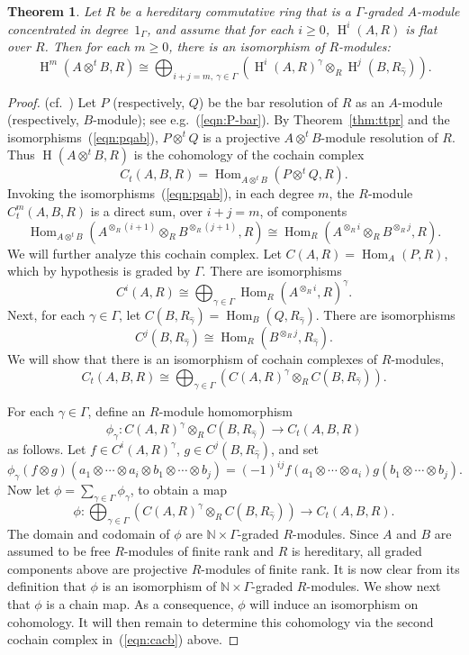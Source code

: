 \documentclass[11pt]{amsart}
\numberwithin{equation}{section}
\newtheorem{theorem}[equation]{Theorem}
\theoremstyle{definition}
\theoremstyle{remark}
\newcommand{\g}{\gamma}
\newcommand{\hg}{\widehat{\g}}
\newcommand{\N}{\mathbb{N}}
\newcommand\Homol{\operatorname{H}}
\newcommand\coh{\Homol}
\newcommand\ot{\otimes}
\newcommand\ott{\otimes^{t}\!}
\newcommand\Hom{\operatorname{Hom}}
\begin{document}
\begin{theorem}\label{thm:main}
  Let $R$ be a hereditary commutative ring that is a 
$\Gamma$-graded $A$-module concentrated in degree~$1_{\Gamma}$,
  and assume that for each $i\geq 0$, 
  $\coh^i(A,R)$ is flat over $R$.
  Then for each $m\geq 0$, 
  there is an isomorphism of $R$-modules:
  \[
  \coh^m(A\ott B , R)\cong \bigoplus_{i+j=m, \ \g\in\Gamma}
   \left( \coh^i(A, R)^{\g} \ot_R \coh^j(B, R_{\hg}) \right) .
  \]
\end{theorem}


\begin{proof}
(cf.~\cite[Theorem 3.1]{BW})
Let $P$ (respectively, $Q$) be the bar resolution of $R$
as an $A$-module (respectively, $B$-module); see e.g.~(\ref{eqn:P-bar}).
By Theorem~\ref{thm:ttpr} and the isomorphisms~(\ref{eqn:pqab}), $P\ott Q$ is a
projective $A\ott B$-module resolution of $R$.
Thus $\coh(A\ott B, R)$ is the
  cohomology of the cochain complex 
\[
   C_t(A,B,R) = \Hom_{A\ott B}(P\ott Q , R) .
\]
  Invoking the isomorphisms~(\ref{eqn:pqab}),  
  in each degree $m$, the $R$-module $C^m_t(A,B,R)$ is a direct sum, over
  $i+j=m$, of components
  \begin{equation}\label{eqn:homab}
  \Hom_{A\ott B}(A^{\ot_R  (i+1)}\ot_R  B^{\ot_R (j+1)}, R)
  \cong  \Hom_{R}(A^{\ot_R  i}\ot_R  B^{\ot_R j}, R) .
  \end{equation}
  We will further analyze this cochain complex.
    Let $C(A,R) = \Hom_A (P,R)$, which by hypothesis is graded by $\Gamma$.
    There are isomorphisms
    \[
    C^i(A,R) \cong  \bigoplus_{\g\in\Gamma}\Hom_R(A^{\ot_R i} , R)^{\g} . 
    \]
Next, for each $\g\in \Gamma$, let $C(B,R_{\hg}) = \Hom_B(Q, R_{\hg})$.
There are isomorphisms
  \[
   C^j(B,R_{\hg})  \cong  \Hom_R (B^{\ot_R j},R_{\hg}) .
   \]
   We will show that there is an isomorphism of cochain complexes of $R$-modules, 
   \begin{equation}\label{eqn:cacb}
   C_t(A,B,R) \cong  
  \bigoplus_{\g\in\Gamma} \left(C(A,R)^{\g} \ot_R C(B, R_{\hg})\right) .
  \end{equation}

For each $\g\in\Gamma$, define an $R$-module homomorphism
  \[
    \phi_{\g}:    C(A,R)^{\g} \ot_R C(B, R_{\hg}) \rightarrow C_t(A,B,R)
    \]
as follows. 
Let $f\in C^i(A,R)^{\g}$, $g\in C^j(B,R_{\hg})$, and set
    \[
    \phi_{\g}(f\ot g) (a_1\ot\cdots\ot a_i \ot  b_1\ot \cdots\ot b_j)
    = (-1)^{ij}  f(a_1\ot\cdots \ot a_i)g(b_1\ot\cdots\ot b_j) .
    \]
Now let $\phi = \sum_{\g\in\Gamma}\phi_{\g}$, to obtain a map
\[
  \phi:  \bigoplus_{\g\in\Gamma} \left(C(A,R)^{\g} \ot_R C(B, R_{\hg})\right)
  \rightarrow C_t(A,B,R) .
  \]
The domain and codomain of $\phi$ are $\N\times \Gamma$-graded $R$-modules. 
Since $A$ and $B$ are assumed to be 
free $R$-modules of finite rank and $R$ is hereditary, 
all graded components above are projective $R$-modules of finite rank.
It is now clear from its definition
that $\phi$ is an isomorphism of $\N\times\Gamma$-graded $R$-modules.
    We show next that $\phi$ is a chain map.
    As a consequence, $\phi$ will induce an isomorphism on cohomology.
    It will then remain to determine this cohomology via the
    second cochain complex in~(\ref{eqn:cacb}) above.


\end{proof}
\end{document}
